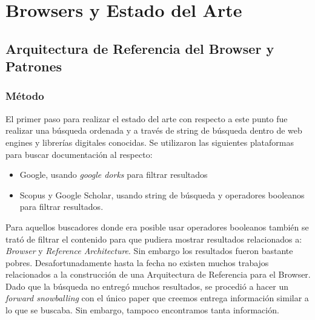 \chapter{Browsers y Estado del Arte}
\label{chap4:EA}

\section{Arquitectura de Referencia del Browser y Patrones}
\label{chap3:ArqRefBrowandPatt}


\subsection{Método}
El primer paso para realizar el estado del arte con respecto a este punto fue realizar una búsqueda ordenada y a través de string de búsqueda dentro de web engines y librerías digitales conocidas. Se utilizaron las siguientes plataformas para buscar documentación al respecto:
\begin{itemize}
    \item Google, usando \textit{google dorks} para filtrar resultados
    \item Scopus y Google Scholar, usando string de búsqueda y operadores booleanos para filtrar resultados.
\end{itemize}

Para aquellos buscadores donde era posible usar operadores booleanos también se trató de filtrar el contenido para que pudiera mostrar resultados relacionados a: \textit{Browser} y \textit{Reference Architecture}. Sin embargo los resultados fueron bastante pobres. Desafortunadamente hasta la fecha no existen muchos trabajos relacionados a la construcción de una Arquitectura de Referencia para el Browser. Dado que la búsqueda no entregó muchos resultados, se procedió a hacer un \textit{forward snowballing} con el único paper que creemos entrega información similar a lo que se buscaba. Sin embargo, tampoco encontramos tanta información.

